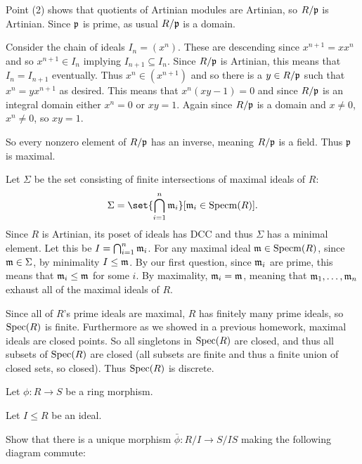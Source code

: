     \item
    \benum
        \item Point (2) shows that quotients of Artinian modules are Artinian, so $R/{{\frak p}}$ is Artinian.
        Since ${{\frak p}}$ is prime, as usual $R/{{\frak p}}$ is a domain.

        Consider the chain of ideals $I_n=(x^n)$.
        These are descending since $x^{n+1}=xx^n$ and so $x^{n+1}\in I_n$ implying $I_{n+1}\subseteq I_n$.
        Since $R/{{\frak p}}$ is Artinian, this means that $I_n=I_{n+1}$ eventually.
        Thus $x^n\in(x^{n+1})$ and so there is a $y\in R/{{\frak p}}$ such that $x^n=yx^{n+1}$ as desired.
        This means that $x^n(xy-1)=0$ and since $R/{{\frak p}}$ is an integral domain either $x^n=0$ or $xy=1$.
        Again since $R/{{\frak p}}$ is a domain and $x\neq0$, $x^n\neq0$, so $xy=1$.

        So every nonzero element of $R/{{\frak p}}$ has an inverse, meaning $R/{{\frak p}}$ is a field.
        Thus ${{\frak p}}$ is maximal.

        \item Let $\Sigma$ be the set consisting of finite intersections of maximal ideals of $R$:
        $$ \Sigma = \set{\bigcap_{i=1}^n\m_i}[\m_i\in\specm(R)] . $$
        Since $R$ is Artinian, its poset of ideals has DCC and thus $\Sigma$ has a minimal element.
        Let this be $I=\bigcap_{i=1}^n{{\frak m}}_i$.
        For any maximal ideal ${{\frak m}}\in{\rm Specm}(R)$, since ${{\frak m}}\in\Sigma$, by minimality $I\leq{{\frak m}}$.
        By our first question, since ${{\frak m}}_i$ are prime, this means that ${{\frak m}}_i\leq{{\frak m}}$ for some $i$.
        By maximality, ${{\frak m}}_i={{\frak m}}$, meaning that ${{\frak m}}_1,\dots,{{\frak m}}_n$ exhaust all of the maximal ideals of $R$.

        \item Since all of $R$'s prime ideals are maximal, $R$ has finitely many prime ideals, so ${\rm Spec}(R)$ is finite.
        Furthermore as we showed in a previous homework, maximal ideals are closed points.
        So all singletons in ${\rm Spec}(R)$ are closed, and thus all subsets of ${\rm Spec}(R)$ are closed (all subsets are finite
        and thus a finite union of closed sets, so closed).
        Thus ${\rm Spec}(R)$ is discrete.
    \eenum
\eenum

\bprob

    Let $\phi\colon R\to S$ be a ring morphism.
    \benum
        \item Let $I\leq R$ be an ideal.
        \benum
            \item Show that there is a unique morphism $\bar\phi\colon R/I\to S/IS$ making the following diagram commute:

